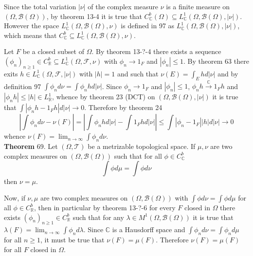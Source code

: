 \documentclass[a4paper]{article}
\newcommand{\brac}[1]{\left ( #1 \right )}
\newcommand{\abs}[1]{\left | #1 \right |}
\newcommand{\Real}{\mathbb{R}}
\newcommand{\Cplx}{\mathbb{C}}
\newcommand{\Tcal}{\mathcal{T}}
\newcommand{\Fcal}{\mathcal{F}}
\newcommand{\borel}[1]{\mathcal{B}\brac{#1}}
\begin{document}
Since the total variation $\abs{\nu}$ of the complex measure $\nu$ is a finite measure on $\brac{\Omega, \borel{\Omega}}$, by theorem 13-4 it is true that $C^b_\Cplx\brac{\Omega}\subseteq L^1_\Cplx\brac{\Omega, \borel{\Omega}, \abs{\nu}}$. However the space $L^1_\Cplx\brac{\Omega, \borel{\Omega}, \nu}$ is defined in 97 as $L^1_\Cplx\brac{\Omega, \borel{\Omega}, \abs{\nu}}$, which means that $C^b_\Cplx\subseteq L^1_\Cplx\brac{\Omega,\borel{\Omega},\nu}$.

Let $F$ be a closed subset of $\Omega$. By theorem 13-?-4 there exists a sequence $\brac{\phi_n}_{n\geq1}\in C^b_\Real\subseteq L^1_\Cplx\brac{\Omega,\Fcal,\nu}$ with $\phi_n\to 1_F$ and $\abs{\phi_n}\leq1$. By theorem 63 there exits $h\in L^1_\Cplx\brac{\Omega,\Fcal,\abs{\nu}}$ with $\abs{h}=1$ and such that $\nu\brac{E}=\int_E h d\abs{\nu}$ and by definition 97 $\int \phi_n d\nu = \int \phi_n h d\abs{\nu}$. Since $\phi_n \to 1_F$ and $\abs{\phi_n}\leq 1$, $\phi_n h \overset{\Cplx}{\to} 1_F h$ and $\abs{\phi_n h}\leq \abs{h}\in L^1_\Real$, whence by theorem 23 (DCT) on $\brac{\Omega,\borel{\Omega},\abs{\nu}}$ it is true that $\int \abs{\phi_n h - 1_F h} d\abs{\nu} \to 0$. Therefore by theorem 24 \[\abs{\int \phi_n d\nu - \nu\brac{F} } = \abs{\int \phi_n h d\abs{\nu} - \int 1_F h d\abs{\nu} } \leq \int \abs{\phi_n - 1_F} \abs{h} d\abs{\nu} \to 0\] whence $\nu\brac{F} = \lim_{n\to\infty}\int\phi_n d\nu$.\\

\label{thm:meas_equality} \noindent \textbf{Theorem} 69.
Let $\brac{\Omega,\Tcal}$ be a metrizable topological space. If $\mu,\nu$ are two complex measures on $\brac{\Omega, \borel{\Omega}}$ such that for all $\phi\in C^b_\Cplx$ \[\int \phi d\mu = \int \phi d\nu\] then $\nu = \mu$.

Now, if $\nu,\mu$ are two complex measures on $\brac{\Omega,\borel{\Omega}}$ with $\int \phi d\nu = \int \phi d\mu$ for all $\phi \in C^b_\Real$, then in particular by theorem 13-?-6 for every $F$ closed in $\Omega$ there exists $\brac{\phi_n}_{n\geq1}\in C^b_\Real$ such that for any $\lambda\in M^1\brac{\Omega,\borel{\Omega}}$ it is true that $\lambda\brac{F} = \lim_{n\to\infty}\int \phi_n d\lambda$. Since $\Cplx$ is a Hausdorff space and $\int \phi_n d\nu = \int \phi_n d\mu$ for all $n\geq1$, it must be true that $\nu\brac{F}=\mu\brac{F}$. Therefore $\nu\brac{F}=\mu\brac{F}$ for all $F$ closed in $\Omega$.
\end{document}
